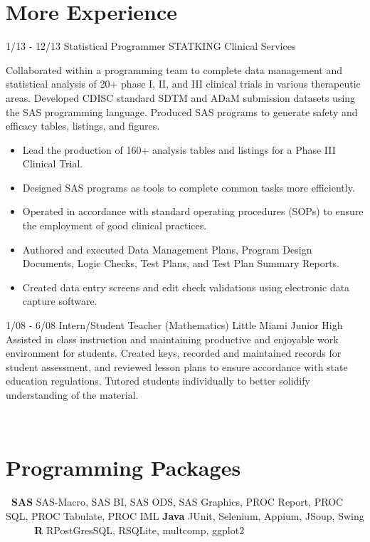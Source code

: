 \documentclass[]{moak-resume}
\begin{document}
\section{More Experience}
\begin{entrylist}
    \entry
    {1/13 - 12/13}
    {Statistical Programmer}
    {STATKING Clinical Services}
    {Collaborated within a programming team to complete data management and statistical analysis of 20+ phase I, II, and III clinical trials in various therapeutic areas. Developed CDISC standard SDTM and ADaM submission datasets using the SAS programming language. Produced SAS programs to generate safety and efficacy tables, listings, and figures.
    	\begin{itemize}
    		\item Lead the production of 160+ analysis tables and listings for a Phase III Clinical Trial.
    		\item Designed SAS programs as tools to complete common tasks more efficiently.
    		\item Operated in accordance with standard operating procedures (SOPs) to ensure the employment of good clinical practices.
    		\item Authored and executed Data Management Plans, Program Design Documents, Logic Checks, Test Plans, and Test Plan Summary Reports.
    		\item Created data entry screens and edit check validations using electronic data capture software.
    	\end{itemize}}
    \entry
    {1/08 - 6/08}
    {Intern/Student Teacher (Mathematics)}
    {Little Miami Junior High}
    {Assisted in class instruction and maintaining productive and enjoyable work environment for students. Created keys, recorded and maintained records for student assessment, and reviewed lesson plans to ensure accordance with state education regulations. Tutored students individually to better solidify understanding of the material.}
\end{entrylist}
\\
 \section{Programming Packages}
 \begin{entrylist}
 	\entry
 	 {\textbf{ SAS}}
 	 {\textnormal{SAS-Macro, SAS BI, SAS ODS, SAS Graphics, PROC Report, PROC SQL, PROC Tabulate, PROC IML}}
 	 {}
 	 {}
 	\entry
 	 {\textbf{Java}}
 	 {\textnormal{JUnit, Selenium, Appium, JSoup, Swing}}
 	 {}
 	 {}
 	\entry
 	 {\textbf{     R}}
 	 {\textnormal{RPostGresSQL, RSQLite, multcomp, ggplot2}}
 	 {}
 	 {}
 \end{entrylist}
\\
\end{document}
